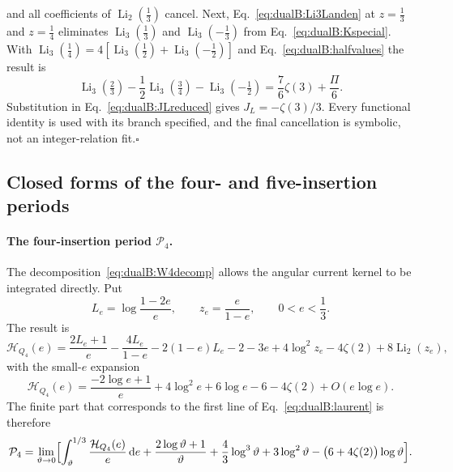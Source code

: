\documentclass[11pt,a4paper]{article}
\numberwithin{equation}{section}
\newcommand{\dd}{\,\mathrm d}
\newcommand{\Li}{\operatorname{Li}}
\begin{document}
and all coefficients of $\Li_2(\frac13)$ cancel. Next, Eq.~\eqref{eq:dualB:Li3Landen} at $z=\frac13$ and $z=\frac14$
eliminates $\Li_3(\frac13)$ and $\Li_3(-\frac13)$ from Eq.~\eqref{eq:dualB:Kspecial}. With
$\Li_3(\frac14)=4[\Li_3(\frac12)+\Li_3(-\frac12)]$ and Eq.~\eqref{eq:dualB:halfvalues} the result is
\begin{equation}
 \Li_3(\tfrac23)-\frac12\Li_3(\tfrac34)-\Li_3(-\tfrac12)=\frac76\zeta(3)+\frac\Pi6.
 \label{eq:dualB:keycombination}
\end{equation}
Substitution in Eq.~\eqref{eq:dualB:JLreduced} gives $J_L=-\zeta(3)/3$. Every functional identity is used with its
branch specified, and the final cancellation is symbolic, not an integer-relation fit.\hfill$\square$

\subsection{Closed forms of the four- and five-insertion periods}\label{app:dualB:periods}
\paragraph{The four-insertion period $\mathcal P_4$.} The decomposition~\eqref{eq:dualB:W4decomp} allows the angular
current kernel to be integrated directly. Put
\begin{equation}
 L_e=\log\frac{1-2e}{e},\qquad z_e=\frac e{1-e},\qquad 0<e<\frac13.
\end{equation}
The result is
\begin{equation}
 \mathcal H_{Q_4}(e)=\frac{2L_e+1}{e}-\frac{4L_e}{1-e}-2(1-e)L_e-2-3e+4\log^2z_e-4\zeta(2)+8\Li_2(z_e),
 \label{eq:dualB:HQexact}
\end{equation}
with the small-$e$ expansion
\begin{equation}
 \mathcal H_{Q_4}(e)=\frac{-2\log e+1}{e}+4\log^2e+6\log e-6-4\zeta(2)+O(e\log e).
\end{equation}
The finite part that corresponds to the first line of Eq.~\eqref{eq:dualB:laurent} is therefore
\begin{equation}
 \mathcal P_4=\lim_{\vartheta\to0}\Bigl[\int_\vartheta^{1/3}\frac{\mathcal H_{Q_4}(e)}{e}\dd e+\frac{2\log\vartheta+1}{\vartheta}
 +\frac43\log^3\vartheta+3\log^2\vartheta-\bigl(6+4\zeta(2)\bigr)\log\vartheta\Bigr].
 \label{eq:dualB:Pfinitepart}
\end{equation}
\end{document}
